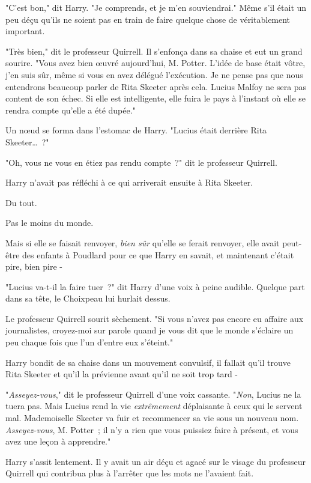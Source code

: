 "C'est bon," dit Harry. "Je comprends, et je m'en souviendrai." Même s'il était un peu déçu qu'ils ne soient pas en train de faire quelque chose de véritablement important.

"Très bien," dit le professeur Quirrell. Il s'enfonça dans sa chaise et eut un grand sourire. "Vous avez bien œuvré aujourd'hui, M. Potter. L'idée de base était vôtre, j'en suis sûr, même si vous en avez délégué l'exécution. Je ne pense pas que nous entendrons beaucoup parler de Rita Skeeter après cela. Lucius Malfoy ne sera pas content de son échec. Si elle est intelligente, elle fuira le pays à l'instant où elle se rendra compte qu'elle a été dupée."

Un nœud se forma dans l'estomac de Harry. "Lucius était derrière Rita Skeeter…~?"

"Oh, vous ne vous en étiez pas rendu compte~?" dit le professeur Quirrell.

Harry n'avait pas réfléchi à ce qui arriverait ensuite à Rita Skeeter.

Du tout.

Pas le moins du monde.

Mais si elle se faisait renvoyer, \emph{bien sûr} qu'elle se ferait renvoyer, elle avait peut-être des enfants à Poudlard pour ce que Harry en savait, et maintenant c'était pire, bien pire -

"Lucius va-t-il la faire tuer~?" dit Harry d'une voix à peine audible. Quelque part dans sa tête, le Choixpeau lui hurlait dessus.

Le professeur Quirrell sourit sèchement. "Si vous n'avez pas encore eu affaire aux journalistes, croyez-moi sur parole quand je vous dit que le monde s'éclaire un peu chaque fois que l'un d'entre eux s'éteint."

Harry bondit de sa chaise dans un mouvement convulsif, il fallait qu'il trouve Rita Skeeter et qu'il la prévienne avant qu'il ne soit trop tard -

"\emph{Asseyez-vous}," dit le professeur Quirrell d'une voix cassante. "\emph{Non}, Lucius ne la tuera pas. Mais Lucius rend la vie \emph{extrêmement} déplaisante à ceux qui le servent mal. Mademoiselle Skeeter va fuir et recommencer sa vie sous un nouveau nom. \emph{Asseyez-vous}, M. Potter~; il n'y a rien que vous puissiez faire à présent, et vous avez une leçon à apprendre."

Harry s'assit lentement. Il y avait un air déçu et agacé sur le visage du professeur Quirrell qui contribua plus à l'arrêter que les mots ne l'avaient fait.

